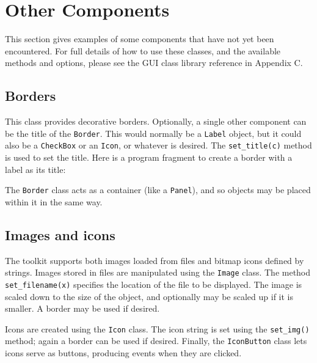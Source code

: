 \section{Other Components}

This section gives examples of some components that have not yet been
encountered. For full details of how to use these classes, and the
available methods and options, please see the GUI class library
reference in Appendix C.

\subsection*{Borders}

This class provides decorative borders. Optionally, a single other
component can be the title of the \texttt{Border}. This would normally
be a \texttt{Label} object, but it could also be a \texttt{CheckBox} or
an \texttt{Icon}, or whatever is desired. The \texttt{set\_title(c)}
method is used to set the title. Here is a program fragment to create a
border with a label as its title:


The \texttt{Border} class acts as a container (like a \texttt{Panel}),
and so objects may be placed within it in the same way.

\subsection*{Images and icons}

The toolkit supports both images loaded from files and
bitmap icons defined by strings. Images stored in files are manipulated
using the \texttt{Image} class. The method \texttt{set\_filename(x)}
specifies the location of the file to be displayed. The image is scaled down
to the size of the object, and optionally may be scaled up if it is
smaller. A border may be used if desired.

Icons are created using the \texttt{Icon} class. The icon string is set
using the \texttt{set\_img()} method; again a border can be used if
desired. Finally, the \texttt{IconButton} class lets icons serve as
buttons, producing events when they are clicked.

